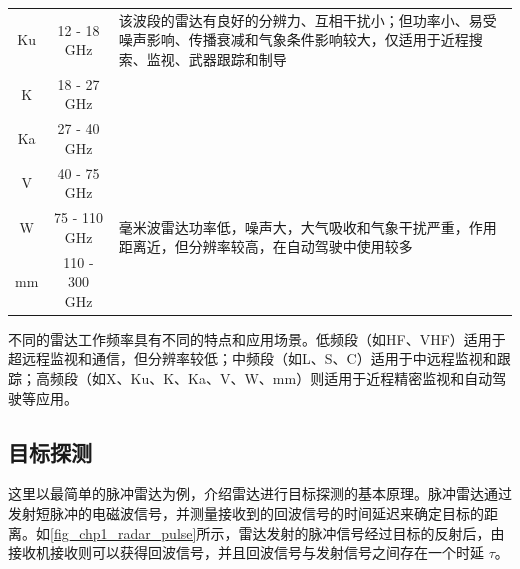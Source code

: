 \begin{table}[htb!]
\begin{tabular}{c|c|p{7cm}}
        \hline
        Ku   & 12 - 18 GHz    & \multirow{1}{7cm}{该波段的雷达有良好的分辨力、互相干扰小；但功率小、易受噪声影响、传播衰减和气象条件影响较大，仅适用于近程搜索、监视、武器跟踪和制导}                           \\
        \cline{1-2}
        K    & 18 - 27 GHz    &                                                                                                                \\
        \cline{1-2}
        Ka   & 27 - 40 GHz    &                                                                                                                \\
        \hline
        V    & 40 - 75 GHz    & \multirow{3}{7cm}{毫米波雷达功率低，噪声大，大气吸收和气象干扰严重，作用距离近，但分辨率较高，在自动驾驶中使用较多}                                            \\
        \cline{1-2}
        W    & 75 - 110 GHz   &                                                                                                                \\
        \cline{1-2}
        mm   & 110 - 300 GHz  &                                                                                                                \\
        \hline
    \end{tabular}
\end{table}

不同的雷达工作频率具有不同的特点和应用场景。低频段（如HF、VHF）适用于超远程监视和通信，但分辨率较低；中频段（如L、S、C）适用于中远程监视和跟踪；高频段（如X、Ku、K、Ka、V、W、mm）则适用于近程精密监视和自动驾驶等应用。

\subsection{目标探测}
这里以最简单的脉冲雷达为例，介绍雷达进行目标探测的基本原理。脉冲雷达通过发射短脉冲的电磁波信号，并测量接收到的回波信号的时间延迟来确定目标的距离。如\cref{fig_chp1_radar_pulse}所示，雷达发射的脉冲信号经过目标的反射后，由接收机接收则可以获得回波信号，并且回波信号与发射信号之间存在一个时延 $\tau$。

